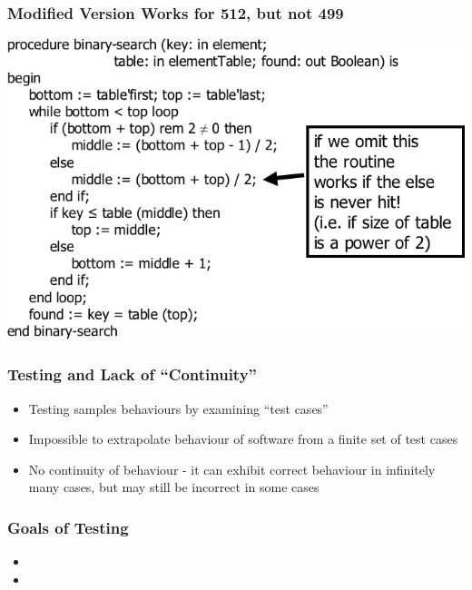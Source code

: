 \documentclass[t,12pt,numbers,fleqn]{beamer}
\begin{document}

\begin{frame}
\frametitle{Modified Version Works for 512, but not 499}

\includegraphics[scale=0.5]{../Figures/BinarySearch.png}

\end{frame}


\begin{frame}
\frametitle{Testing and Lack of ``Continuity''}

\begin{itemize}

\item Testing samples behaviours by examining ``test cases''
\item Impossible to extrapolate behaviour of software from a finite set of test cases
\item No continuity of behaviour - it can exhibit correct behaviour in
  infinitely many cases, but may still be incorrect in some cases

\end{itemize}

\end{frame}


\begin{frame}
\frametitle{Goals of Testing}

\begin{itemize}

\item {}
\item {}

\end{itemize}

\end{frame}
\end{document}
